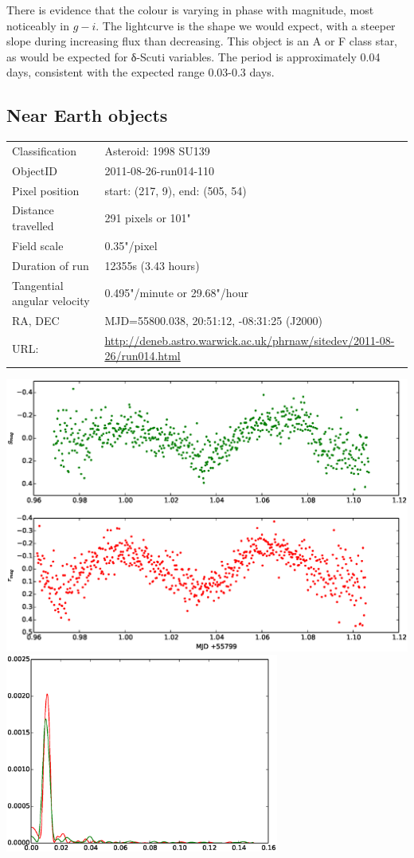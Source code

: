   There is evidence that the colour is varying in phase with magnitude, most noticeably in $g-i$. The lightcurve is the shape we would expect, with a steeper slope during increasing flux than decreasing. This object is an A or F class star, as would be expected for δ-Scuti variables. The period is approximately 0.04 days, consistent with the expected range 0.03-0.3 days.


\newpage
\subsection{Near Earth objects}

  \begin{tabular}{l l}
  Classification & Asteroid: 1998 SU139 \\
  ObjectID & 2011-08-26-run014-110 \\
  Pixel position & start: (217, 9), end: (505, 54) \\
  Distance travelled & 291 pixels or 101" \\
  Field scale & 0.35"/pixel \\
  Duration of run & 12355s (3.43 hours) \\
  Tangential angular velocity & 0.495"/minute or 29.68"/hour\\ 
  RA, DEC & MJD=55800.038, 20:51:12, -08:31:25 (J2000) \\
  URL: & \small \url{http://deneb.astro.warwick.ac.uk/phrnaw/sitedev/2011-08-26/run014.html} \\
  \end{tabular}
  \includegraphics[width=140mm]{images/2011-08-26-run014-110-lightcurve.eps} \\
  \includegraphics[width=90mm]{images/asteroid_pgram.eps} \\

